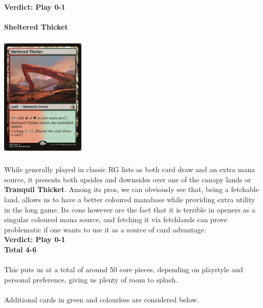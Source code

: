 \documentclass{report}
\begin{document}
\textbf{Verdict: Play 0-1}\\\\
\textbf{Sheltered Thicket}\\
\begin{center}
\includegraphics [width = 4cm, height = 6cm] {sheltered-thicket}
\end{center}
While generally played in classic RG lists as both card draw and an extra mana source, it presents both upsides and downsides over one of the canopy lands or \textbf{Tranquil Thicket}. Among its pros, we can obviously see that, being a fetchable land, allows us to have a better coloured manabase while providing extra utility in the long game. Its cons however are the fact that it is terrible in openers as a singular coloured mana source, and fetching it via fetchlands can prove problematic if one wants to use it as a source of card advantage.\\
\textbf{Verdict: Play 0-1}\\
\textbf{Total 4-6\\\\}
This puts us at a total of around 50 core pieces, depending on playstyle and personal preference, giving us plenty of room to splash.\\\\ Additional cards in green and colourless are considered below.\\\\
\newpage
\end{document}
